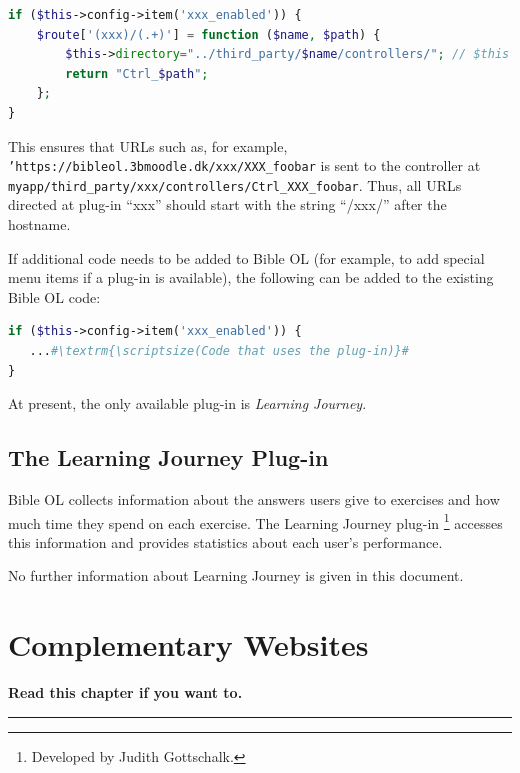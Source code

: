 \documentclass[11pt,oneside,a4paper]{memoir}
\begin{document}
\begin{lstlisting}[language=PHP]
if ($this->config->item('xxx_enabled')) {
    $route['(xxx)/(.+)'] = function ($name, $path) {
        $this->directory="../third_party/$name/controllers/"; // $this is the CI_Router object
        return "Ctrl_$path";
    };
}
\end{lstlisting}

This ensures that URLs such as, for example, \texttt{'https://bibleol.3bmoodle.dk/xxx/XXX\_foobar} is
sent to the controller at \texttt{myapp/third\_party/xxx/controllers/Ctrl\_XXX\_foobar}. Thus, all
URLs directed at plug-in ``xxx'' should start with the string ``/xxx/'' after the hostname.

If additional code needs to be added to Bible OL (for example, to add special menu items if a plug-in
is available), the following can be added to the existing Bible OL code:

\begin{lstlisting}[escapechar=\#,language=PHP]
if ($this->config->item('xxx_enabled')) {
   ...#\textrm{\scriptsize(Code that uses the plug-in)}#
}
\end{lstlisting}


At present, the only available plug-in is \emph{Learning Journey}. 

\section{The Learning Journey Plug-in}\label{sec-lj}

Bible OL collects information about the answers users give to exercises and how much time they spend
on each exercise. The Learning Journey plug-in%
\footnote{Developed by Judith Gottschalk.}
accesses this information and provides statistics about each user's
performance.

No further information about Learning Journey is given in this document.




\chapter{Complementary Websites}

\textbf{Read this chapter if you want to.}
\plainbreak{3}
\end{document}
